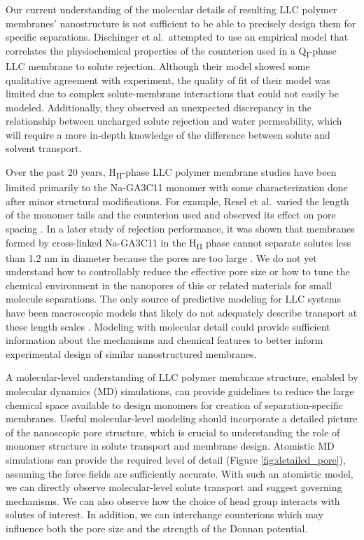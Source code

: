 \documentclass[journal=jpcbfk,manuscript=article]{achemso}
\begin{document}
  Our current understanding of the molecular details of resulting LLC polymer membranes'
  nanostructure is not sufficient to be able to precisely design them for
  specific separations. Dischinger et al.~attempted to use an empirical model
  that correlates the physiochemical properties of the counterion used in a 
  Q\textsubscript{I}-phase LLC membrane to solute rejection\cite{dischinger_effect_2017}.
  Although their model showed some qualitative agreement with experiment, the
  quality of fit of their model was limited due to complex solute-membrane 
  interactions that could not easily be modeled. Additionally, they observed
  an unexpected discrepancy in the relationship between uncharged solute
  rejection and water permeability, which will require a more in-depth knowledge of
  the difference between solute and solvent transport.
  
  Over the past 20 years, H\textsubscript{II}-phase LLC
  polymer membrane studies have been limited primarily to the Na-GA3C11 monomer with some
  characterization done after minor structural modifications. For example, 
  Resel et al.~varied the length of the monomer tails and the counterion used and observed its effect
  on pore spacing \cite{resel_structural_2000}.  In a later study of rejection
  performance, it was shown that membranes formed by cross-linked Na-GA3C11 in
  the H\textsubscript{II} phase cannot separate solutes less than 1.2 nm in
  diameter because the pores are too large \cite{zhou_supported_2005}. We do not
  yet understand how to controllably reduce the effective pore size or how to
  tune the chemical environment in the nanopores of this or related materials for
  small molecule separations. The only source of predictive modeling for LLC
  systems have been macroscopic models that likely do not adequately describe
  transport at these length scales \cite{hatakeyama_water_2011}. Modeling with
  molecular detail could provide sufficient information about the mechanisms and
  chemical features to better inform experimental design of similar
  nanostructured membranes. 

  A molecular-level understanding of LLC polymer membrane structure, enabled by
  molecular dynamics (MD) simulations, can provide guidelines to reduce the large
  chemical space available to design monomers for creation of separation-specific
  membranes. Useful molecular-level modeling should incorporate a detailed
  picture of the nanoscopic pore structure, which is crucial to understanding the
  role of monomer structure in solute transport and membrane design.  Atomistic
  MD simulations can provide the required level of detail (Figure
  \ref{fig:detailed_pore}), assuming the force fields are sufficiently accurate.  With
  such an atomistic model, we can directly observe molecular-level solute
  transport and suggest governing mechanisms. We can also observe how the choice
  of head group interacts with solutes of interest. In addition, we can
  interchange counterions which may influence both the pore size and the strength
  of the Donnan potential. 
\end{document}
